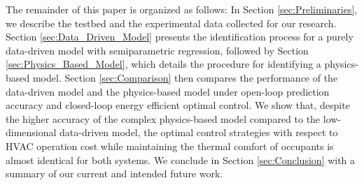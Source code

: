 
The remainder of this paper is organized as follows: In Section \ref{sec:Preliminaries}, we describe the testbed and the experimental data collected for our research. Section \ref{sec:Data_Driven_Model} presents the identification process for a purely data-driven model with semiparametric regression, followed by Section \ref{sec:Physics_Based_Model}, which details the procedure for identifying a physics-based model. Section \ref{sec:Comparison} then compares the performance of the data-driven model and the physics-based model under open-loop prediction accuracy and closed-loop energy efficient optimal control. We show that, despite the higher accuracy of the complex physics-based model compared to the low-dimensional data-driven model, the optimal control strategies with respect to HVAC operation cost while maintaining the thermal comfort of occupants is almost identical for both systems. We conclude in Section \ref{sec:Conclusion} with a summary of our current and intended future work.


